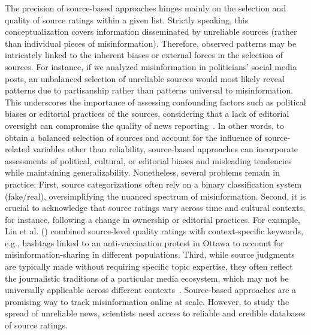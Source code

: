 \documentclass[12pt,twoside]{article}
\begin{document}
The precision of source-based approaches hinges mainly on the selection and quality of source ratings within a given list. 
Strictly speaking, this conceptualization covers information disseminated by unreliable sources (rather than individual pieces of misinformation).
Therefore, observed patterns may be intricately linked to the inherent biases or external forces in the selection of sources. 
For instance, if we analyzed misinformation in politicians' social media posts, an unbalanced selection of unreliable sources would most likely reveal patterns due to partisanship rather than patterns universal to misinformation. 
This underscores the importance of assessing confounding factors such as political biases or editorial practices of the sources, considering that a lack of editorial oversight can compromise the quality of news reporting~\citep{lazerScienceFakeNews2018}.
In other words, to obtain a balanced selection of sources and account for the influence of source-related variables other than reliability, source-based approaches can incorporate assessments of political, cultural, or editorial biases and misleading tendencies while maintaining generalizability. 
Nonetheless, several problems remain in practice: 
First, source categorizations often rely on a binary classification system (fake/real), oversimplifying the nuanced spectrum of misinformation.
Second, it is crucial to acknowledge that source ratings vary across time and cultural contexts, for instance, following a change in ownership or editorial practices. 
For example, Lin et al. (\citeyear{linReducingMisinformationSharing2024}) combined source-level quality ratings with context-specific keywords, e.g., hashtags linked to an anti-vaccination protest in Ottawa to account for misinformation-sharing in different populations.
Third, while source judgments are typically made without requiring specific topic expertise, they often reflect the journalistic traditions of a particular media ecosystem, which may not be universally applicable across different contexts~\citep{bruggemannHallinManciniRevisited2014b}.
Source-based approaches are a promising way to track misinformation online at scale. 
However, to study the spread of unreliable news, scientists need access to reliable and credible databases of source ratings. 
\end{document}
